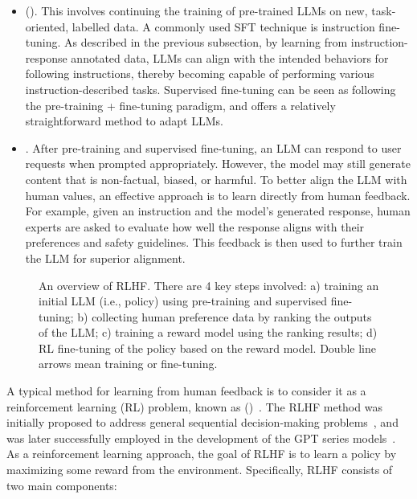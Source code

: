 \begin{itemize}
\item \vspace{0.5em}  (). This involves continuing the training of pre-trained LLMs on new, task-oriented, labelled data. A commonly used SFT technique is instruction fine-tuning. As described in the previous subsection, by learning from instruction-response annotated data, LLMs can align with the intended behaviors for following instructions, thereby becoming capable of performing various instruction-described tasks. Supervised fine-tuning can be seen as following the pre-training + fine-tuning paradigm, and offers a relatively straightforward method to adapt LLMs.
\item \vspace{0.3em} . After pre-training and supervised fine-tuning, an LLM can respond to user requests when prompted appropriately. However, the model may still generate content that is non-factual, biased, or harmful. To better align the LLM with human values, an effective approach is to learn directly from human feedback. For example, given an instruction and the model's generated response, human experts are asked to evaluate how well the response aligns with their preferences and safety guidelines. This feedback is then used to further train the LLM for superior alignment.
\end{itemize}
\vspace{0.5em}

\begin{figure}[!t]
\centering

\caption{An overview of RLHF. There are 4 key steps involved: a) training an initial LLM (i.e., policy) using pre-training and supervised fine-tuning; b) collecting human preference data by ranking the outputs of the LLM; c) training a reward model using the ranking results; d) RL fine-tuning of the policy based on the reward model. Double line arrows mean training or fine-tuning.}
\label{fig:llm-rlhf-overview}
\end{figure}


A typical method for learning from human feedback is to consider it as a reinforcement learning (RL) problem, known as  ()~\cite{ouyang-etal:2022training}. The RLHF method was initially proposed to address general sequential decision-making problems~\cite{christiano-etal:2017deep}, and was later successfully employed in the development of the GPT series models~\cite{stiennon-etal:2020learning}. As a reinforcement learning approach, the goal of RLHF is to learn a policy by maximizing some reward from the environment. Specifically, RLHF consists of two main components:

